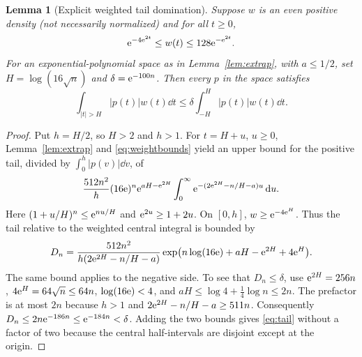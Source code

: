 \documentclass[11pt]{article}
\newtheorem{lemma}[theorem]{Lemma}
\theoremstyle{remark}\newtheorem{remark}[theorem]{Remark}
\begin{document}
\begin{lemma}[Explicit weighted tail domination]\label{lem:tail}
Suppose $w$ is an even positive density (not necessarily normalized) and for all $t\ge0$,
\begin{equation}\label{eq:weightbounds}
\mathrm e^{-4\mathrm e^{2t}}\le w(t)\le128\mathrm e^{-\mathrm e^{2t}}.
\end{equation}
For an exponential-polynomial space as in Lemma~\ref{lem:extrap}, with $a\le1/2$, set $H=\log(16\sqrt n)$ and $\delta=\mathrm e^{-100n}$. Then every $p$ in the space satisfies
\begin{equation}\label{eq:tail}
\int_{|t|>H}|p(t)|w(t)\dd t\le\delta\int_{-H}^{H}|p(t)|w(t)\dd t.
\end{equation}
\end{lemma}
\begin{proof}
Put $h=H/2$, so $H>2$ and $h>1$. For $t=H+u$, $u\ge0$, Lemma~\ref{lem:extrap} and \eqref{eq:weightbounds} yield an upper bound for the positive tail, divided by $\int_0^h |p(v)|\dd v$, of
\[
\frac{512n^2}{h}(16\mathrm e)^n\mathrm e^{aH-\mathrm e^{2H}}
\int_0^\infty \mathrm e^{-(2\mathrm e^{2H}-n/H-a)u}\,\mathrm d u.
\]
Here $(1+u/H)^n\le\mathrm e^{nu/H}$ and $\mathrm e^{2u}\ge1+2u$. On $[0,h]$, $w\ge\mathrm e^{-4\mathrm e^H}$. Thus the tail relative to the weighted central integral is bounded by
\begin{equation}\label{eq:delta}
D_n=\frac{512n^2}{h(2\mathrm e^{2H}-n/H-a)}\exp\bigl(n\log(16\mathrm e)+aH-\mathrm e^{2H}+4\mathrm e^H\bigr).
\end{equation}
The same bound applies to the negative side. To see that $D_n\le\delta$, use $\mathrm e^{2H}=256n$, $4\mathrm e^H=64\sqrt n\le64n$, $\log(16\mathrm e)<4$, and $aH\le\log4+\tfrac14\log n\le2n$. The prefactor is at most $2n$ because $h>1$ and $2\mathrm e^{2H}-n/H-a\ge511n$. Consequently $D_n\le 2n\mathrm e^{-186n}\le\mathrm e^{-184n}<\delta$. Adding the two bounds gives \eqref{eq:tail} without a factor of two because the central half-intervals are disjoint except at the origin.
\end{proof}
\end{document}
